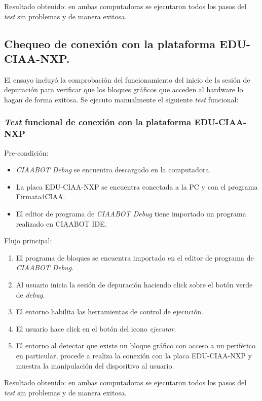 Resultado obtenido: en ambas computadoras se ejecutaron todos los pasos del \emph{test} sin problemas y de manera exitosa. 


\subsection{Chequeo de conexión con la plataforma EDU-CIAA-NXP.}
\label{subsec:Chequeo de conexión con la plataforma EDU-CIAA-NXP.}

El ensayo incluyó la comprobación del funcionamiento del inicio de la sesión de depuración para verificar que los bloques gráficos que acceden al hardware lo hagan de forma exitosa. Se ejecuto manualmente el siguiente \emph{test} funcional:

\subsubsection{\emph{Test} funcional de conexión con la plataforma EDU-CIAA-NXP}
Pre-condición:
\begin{itemize}
	\item
	\emph{CIAABOT Debug} se encuentra descargado en la computadora.
	\item
	La placa EDU-CIAA-NXP se encuentra conectada a la PC y con el programa Firmata4CIAA.
	\item
    El editor de programa de \emph{CIAABOT Debug} tiene importado un programa realizado en CIAABOT IDE.
\end{itemize}
Flujo principal:
\begin{enumerate}
	\item
	El programa de bloques se encuentra importado en el editor de programa de \emph{CIAABOT Debug}.
	\item
	Al usuario inicia la sesión de depuración haciendo click sobre el botón verde de \emph{debug}.
	\item
	El entorno habilita las herramientas de control de ejecución.
	\item
	El usuario hace click en el botón del icono \emph{ejecutar}.
	\item
	El entorno al detectar que existe un bloque gráfico con acceso a un periférico en particular, procede a realiza la conexión con la placa EDU-CIAA-NXP y muestra la manipulación del dispositivo al usuario.
\end{enumerate}

Resultado obtenido: en ambas computadoras se ejecutaron todos los pasos del \emph{test} sin problemas y de manera exitosa.




